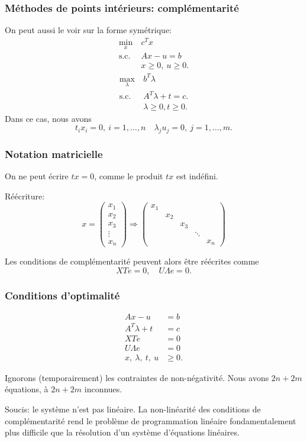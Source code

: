 \documentclass[t,usepdftitle=false]{beamer}
\begin{document}
\begin{frame}
\frametitle{Méthodes de points intérieurs: complémentarité}

On peut aussi le voir sur la forme symétrique:
\begin{align*}
\min_x\ & c^T x \\
\mbox{s.c. } & Ax - u = b \\
& x \geq 0,\ u \geq 0.
\end{align*}
\begin{align*}
\max_{\lambda} \  & b^T \lambda \\
\mbox{s.c. } & A^T \lambda  +t = c. \\
& \lambda \geq 0, t \geq 0.
\end{align*}
Dans ce cas, nous avons
\[
t_i x_i = 0,\ i = 1,\ldots,n \quad
\lambda_j u_j = 0,\ j = 1,\ldots, m.
\]

\end{frame}

\begin{frame}
\frametitle{Notation matricielle}

On ne peut écrire $tx = 0$, comme le produit $tx$ est indéfini.

\mbox{}

Réécriture:
\[
x = \begin{pmatrix}
x_1 \\ x_2 \\ x_3 \\ \vdots \\ x_n
\end{pmatrix}
\Rightarrow
\begin{pmatrix}
x_1 \\ & x_2 \\ & & x_3 \\ & & & \ddots \\ & & & & x_n
\end{pmatrix}
\]

\mbox{}

Les conditions de complémentarité peuvent alors être réécrites comme
\[
XTe = 0,\quad U\Lambda e = 0.
\]
\end{frame}

\begin{frame}
\frametitle{Conditions d'optimalité}

\begin{align*}
Ax - u &= b \\
A^T \lambda + t &= c \\
XTe &= 0\\
U\Lambda e &= 0\\
x,\ \lambda,\ t,\ u &\geq 0.
\end{align*}

\mbox{}

Ignorons (temporairement) les contraintes de non-négativité.
Nous avons $2n + 2m$ équations, à $2n + 2m$ inconnues.

\mbox{}

Soucis: le système n'est pas linéaire. La non-linéarité des conditions de complémentarité rend le problème de programmation linéaire fondamentalement plus difficile que la résolution d'un système d'équations linéaires.

\end{frame}
\end{document}
